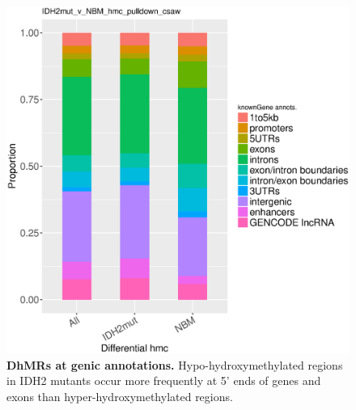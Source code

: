 \newpage

\begin{figure}[ht!]
\centering
\includegraphics[width=1\textwidth]{chap5figs/figure5_11.eps}
\caption[DhMRs at genic annotations.]
{
\textbf{DhMRs at genic annotations.} Hypo-hydroxymethylated regions in IDH2 mutants occur more frequently at 5' ends of genes and exons than hyper-hydroxymethylated regions.
}
\label{chap5:fig:11}
\end{figure}

\newpage

